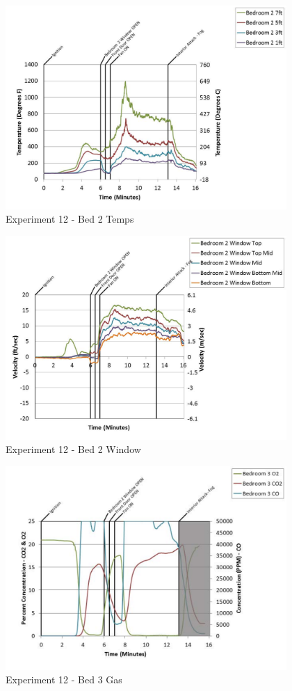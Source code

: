 \documentclass{article}
\begin{document}
\begin{appendices}
	\clearpage

	\begin{figure}[h!]
		\centering
		\includegraphics[height=3.05in]{0_Images/Results_Charts/Exp_12_Charts/Bed2Temps.pdf}
		\caption{Experiment 12 - Bed 2 Temps}
	\end{figure}
 

	\begin{figure}[h!]
		\centering
		\includegraphics[height=3.05in]{0_Images/Results_Charts/Exp_12_Charts/Bed2Window.pdf}
		\caption{Experiment 12 - Bed 2 Window}
	\end{figure}
 
	\clearpage

	\begin{figure}[h!]
		\centering
		\includegraphics[height=3.05in]{0_Images/Results_Charts/Exp_12_Charts/Bed3Gas.pdf}
		\caption{Experiment 12 - Bed 3 Gas}
	\end{figure}
 


\end{appendices}
\end{document}
